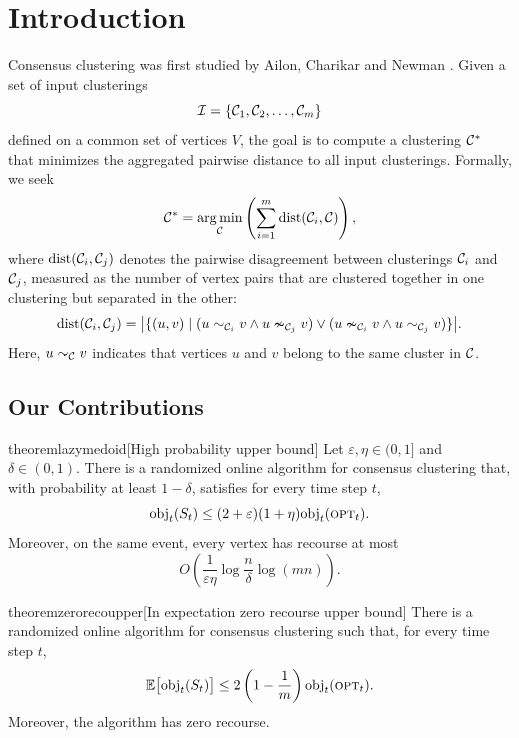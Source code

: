 \section{Introduction}

Consensus clustering was first studied by Ailon, Charikar and Newman \cite{ailon2008aggregating}. Given a set of input clusterings 
\[
\mathcal{I} = \{ \mathcal{C}_1, \mathcal{C}_2, \ldots, \mathcal{C}_m \}
\]
defined on a common set of vertices $V$, the goal is to compute a clustering $\mathcal{C}^*$ that minimizes the aggregated pairwise distance to all input clusterings. 
Formally, we seek
\[
    \mathcal{C}^* = \operatorname*{arg\,min}_{\mathcal{C}} \left( \sum_{i = 1}^m \text{dist}(\mathcal{C}_i, \mathcal{C}) \right),
\]
where $\text{dist}(\mathcal{C}_i, \mathcal{C}_j)$ denotes the pairwise disagreement between clusterings $\mathcal{C}_i$ and $\mathcal{C}_j$, measured as the number of vertex pairs that are clustered together in one clustering but separated in the other:
\[
    \text{dist}(\mathcal{C}_i, \mathcal{C}_j) = 
    \big| \{ (u,v) \mid 
    (u \sim_{\mathcal{C}_i} v \land u \nsim_{\mathcal{C}_j} v)
    \lor 
    (u \nsim_{\mathcal{C}_i} v \land u \sim_{\mathcal{C}_j} v)
    \} \big|.
\]
Here, $u \sim_{\mathcal{C}} v$ indicates that vertices $u$ and $v$ belong to the same cluster in $\mathcal{C}$.

\subsection{Our Contributions}

\begin{restatable}{theorem}{lazymedoid}[High probability upper bound]
\label{thm:sampled-lazy-medoid}
    Let \(\varepsilon,\eta\in(0,1]\) and \(\delta\in(0,1)\). There is a randomized online algorithm for consensus clustering that, with probability at least \(1-\delta\), satisfies for every time step \(t\),
\[
    \text{obj}_t(S_t)
    \le
    (2+\varepsilon)(1+\eta)\text{obj}_t(\textsc{opt}_t).
\]
Moreover, on the same event, every vertex has recourse at most
\[
    O\left(
        \frac{1}{\varepsilon\eta}
        \log\frac{n}{\delta}
        \log(mn)
    \right).
\]
\end{restatable}

\begin{restatable}{theorem}{zerorecoupper}[In expectation zero recourse upper bound]
    \label{thm:random-zero-recourse}
    There is a randomized online algorithm for consensus clustering such that, for every time step \(t\),
    \[
        \mathbb{E}\bigl[\text{obj}_t(S_t)\bigr] \le 2\left(1-\frac1m\right)\text{obj}_t(\textsc{opt}_t).
    \]
    Moreover, the algorithm has zero recourse.
\end{restatable}

